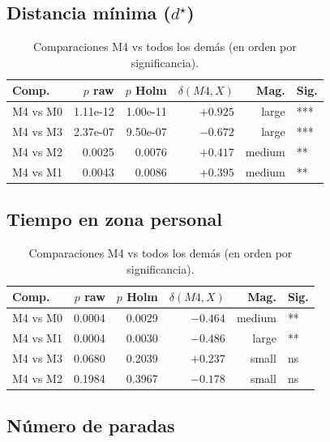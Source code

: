 \documentclass[12pt,a4paper,oneside]{book}
\begin{document}
\subsection{Distancia mínima ($d^\star$)}

\begin{table}[H]
\centering
\caption{Comparaciones M4 vs todos los demás (en orden por significancia).}
\begin{tabular}{lrrrrl}
\toprule
\textbf{Comp.} & \textbf{$p$ raw} & \textbf{$p$ Holm} & \textbf{$\delta(M4, X)$} & \textbf{Mag.} & \textbf{Sig.} \\
\midrule
M4 vs M0 & 1.11e-12 & 1.00e-11 & $+0.925$ & large & *** \\
M4 vs M3 & 2.37e-07 & 9.50e-07 & $-0.672$ & large & *** \\
M4 vs M2 & 0.0025 & 0.0076 & $+0.417$ & medium & ** \\
M4 vs M1 & 0.0043 & 0.0086 & $+0.395$ & medium & ** \\
\bottomrule
\end{tabular}
\end{table}

\subsection{Tiempo en zona personal}

\begin{table}[H]
\centering
\caption{Comparaciones M4 vs todos los demás (en orden por significancia).}
\begin{tabular}{lrrrrl}
\toprule
\textbf{Comp.} & \textbf{$p$ raw} & \textbf{$p$ Holm} & \textbf{$\delta(M4, X)$} & \textbf{Mag.} & \textbf{Sig.} \\
\midrule
M4 vs M0 & 0.0004 & 0.0029 & $-0.464$ & medium & ** \\
M4 vs M1 & 0.0004 & 0.0030 & $-0.486$ & large & ** \\
M4 vs M3 & 0.0680 & 0.2039 & $+0.237$ & small & ns \\
M4 vs M2 & 0.1984 & 0.3967 & $-0.178$ & small & ns \\
\bottomrule
\end{tabular}
\end{table}

\subsection{Número de paradas}
\end{document}
